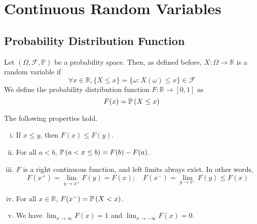 \documentclass{article}
\begin{document}
\section{Continuous Random Variables}
\subsection{Probability Distribution Function}
Let $(\Omega, \mathcal F, \mathbb P)$ be a probability space. Then, as defined before, $X \colon \Omega \to \mathbb R$ is a random variable if
\[ \forall x \in \mathbb R, \{ X \leq x \} = \{ \omega \colon X(\omega) \leq x \} \in \mathcal F \]
We define the probability distribution function $F \colon \mathbb R \to [0, 1]$ as
\[ F(x) = \mathbb{P}\left({X \leq x}\right) \]
\begin{theorem}
	The following properties hold.
	\begin{enumerate}[(i)]
		\item If $x \leq y$, then $F(x) \leq F(y)$.
		\item For all $a < b$, $\mathbb{P}\left({a < x \leq b}\right) = F(b) - F(a)$.
		\item $F$ is a right continuous function, and left limits always exist. In other words,
		      \[ F(x^+) = \lim_{y \to x^+} F(y) = F(x);\quad F(x^-) = \lim_{y \to x^-} F(y) \leq F(x) \]
		\item For all $x \in\mathbb R$, $F(x^-) = \mathbb{P}\left({X < x}\right)$.
		\item We have $\lim_{x \to \infty} F(x) = 1$ and $\lim_{x \to -\infty} F(x) = 0$.
	\end{enumerate}
\end{theorem}
\end{document}
